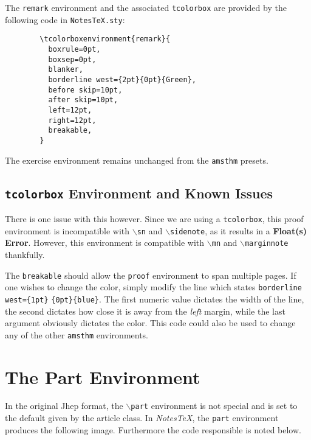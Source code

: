 \documentclass[10pt]{article}
\begin{document}
	\begin{remark}
		The \texttt{remark} environment and the associated \texttt{tcolorbox} are provided by the following code in \texttt{NotesTeX.sty}:
		\begin{verbatim}
		\tcolorboxenvironment{remark}{
		  boxrule=0pt,
		  boxsep=0pt,
		  blanker,
		  borderline west={2pt}{0pt}{Green},
		  before skip=10pt,
		  after skip=10pt,
		  left=12pt,
		  right=12pt,
		  breakable,
		}
		\end{verbatim}
	\end{remark}
	\begin{exercise}
		The exercise environment remains unchanged from the \texttt{amsthm} presets.
	\end{exercise}



	\subsection{\texttt{tcolorbox} Environment and Known Issues} %
	\label{ssub:tcolorbox environments_and_known_issues}
	
	There is one issue with this however. Since we are using a \texttt{tcolorbox}, this proof environment is incompatible with \texttt{$\backslash$sn} and \texttt{$\backslash$sidenote}, as it results in a \textbf{Float(s) Error}. However, this environment is compatible with \texttt{$\backslash$mn} and \texttt{$\backslash$marginnote} thankfully.


	The \texttt{breakable} should allow the \texttt{proof} environment to span multiple pages. If one wishes to change the color, simply modify the line which states \texttt{borderline west=\{1pt\}} \texttt{\{0pt\}\{blue\}}. The first numeric value dictates the width of the line, the second dictates how close it is away from the \textit{left} margin, while the last argument obviously dictates the color. This code could also be used to change any of the other \texttt{amsthm} environments.


	\section{The Part Environment}\label{sec:part}
	In the original Jhep format, the \texttt{$\backslash$part} environment is not special and is set to the default given by the article class. In \textit{NotesTeX}, the \texttt{part} environment produces the following image. Furthermore the code responsible is noted below.\\
\end{document}
